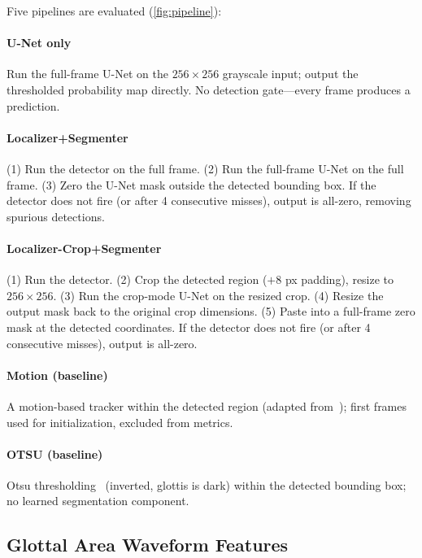 \documentclass[preprint,12pt]{elsarticle}
\newcommand{\yolounet}{Localizer+Segmenter}
\newcommand{\yolocrop}{Localizer-Crop+Segmenter}
\begin{document}
Five pipelines are evaluated (\cref{fig:pipeline}):

\paragraph{U-Net only}
Run the full-frame U-Net on the \(256\times256\) grayscale input; output the
thresholded probability map directly.
No detection gate---every frame produces a prediction.

\paragraph{\yolounet{}}
(1) Run the detector on the full frame.
(2) Run the full-frame U-Net on the full frame.
(3) Zero the U-Net mask outside the detected bounding box.
If the detector does not fire (or after \num{4} consecutive misses), output is
all-zero, removing spurious detections.

\paragraph{\yolocrop{}}
(1) Run the detector.
(2) Crop the detected region (\(+8\) px padding), resize to \(256\times256\).
(3) Run the crop-mode U-Net on the resized crop.
(4) Resize the output mask back to the original crop dimensions.
(5) Paste into a full-frame zero mask at the detected coordinates.
If the detector does not fire (or after \num{4} consecutive misses), output is
all-zero.

\paragraph{Motion (baseline)}
A motion-based tracker within the detected region (adapted from~\cite{patel2015kinematic}); first frames used for initialization, excluded from metrics.

\paragraph{OTSU (baseline)}
Otsu thresholding~\cite{otsu1979threshold} (inverted, glottis is dark) within the detected bounding box; no learned segmentation component.

\subsection{Glottal Area Waveform Features}
\label{sec:gaw_features}
\end{document}

